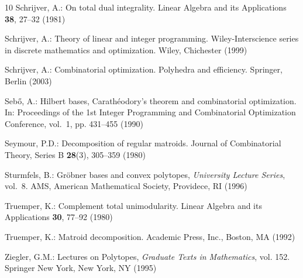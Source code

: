 \documentclass[11pt,a4paper]{amsart}
\theoremstyle{plain}
\theoremstyle{definition}
\begin{document}
\begin{thebibliography}{10}
Schrijver, A.: On total dual integrality.
\newblock Linear Algebra and its Applications \textbf{38}, 27–32 (1981)

Schrijver, A.: Theory of linear and integer programming.
\newblock Wiley-Interscience series in discrete mathematics and optimization.
Wiley, Chichester (1999)

Schrijver, A.: Combinatorial optimization. Polyhedra and efficiency.
\newblock Springer, Berlin (2003)

Seb{\H o}, A.: Hilbert bases, {C}arath\'eodory’s theorem and combinatorial
optimization.
\newblock In: Proceedings of the 1st Integer Programming and Combinatorial
Optimization Conference, vol.~1, pp. 431–455 (1990)

Seymour, P.D.: Decomposition of regular matroids.
\newblock Journal of Combinatorial Theory, Series {B} \textbf{28}(3), 305--359
(1980)

Sturmfels, B.: Gröbner bases and convex polytopes, \emph{University Lecture Series},
vol.~8.
\newblock AMS, American Mathematical Society, Providece, RI (1996)

Truemper, K.: Complement total unimodularity.
\newblock Linear Algebra and its Applications \textbf{30}, 77–92 (1980)

Truemper, K.: Matroid decomposition.
\newblock Academic Press, Inc., Boston, MA (1992)

Ziegler, G.M.: Lectures on Polytopes, \emph{Graduate Texts in Mathematics},
vol. 152.
\newblock Springer New York, New York, NY (1995)

\end{thebibliography}


	
\end{document}
